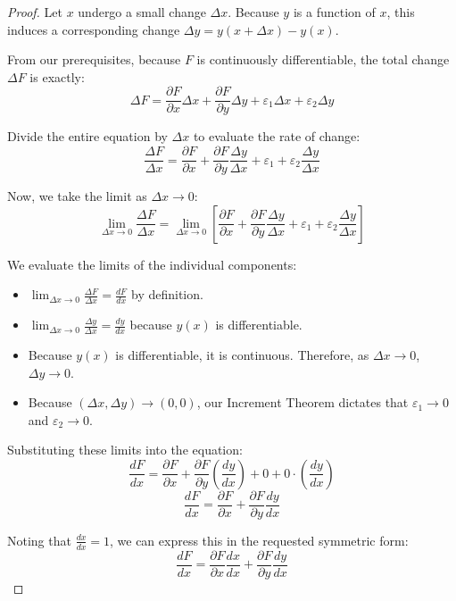 \documentclass{essay}
\begin{document}
\begin{proof}
  Let \(x\) undergo a small change \(\Delta x\). Because \(y\) is a function of \(x\), this induces a corresponding change \(\Delta y = y(x+\Delta x) - y(x)\).

  From our prerequisites, because \(F\) is continuously differentiable, the total change \(\Delta F\) is exactly:
  \[ \Delta F = \frac{\partial F}{\partial x}\Delta x + \frac{\partial F}{\partial y}\Delta y + \varepsilon_{1} \Delta x + \varepsilon_{2} \Delta y \]

  Divide the entire equation by \(\Delta x\) to evaluate the rate of change:
  \[ \frac{\Delta F}{\Delta x} = \frac{\partial F}{\partial x} + \frac{\partial F}{\partial y}\frac{\Delta y}{\Delta x} + \varepsilon_{1} + \varepsilon_{2} \frac{\Delta y}{\Delta x} \]

  Now, we take the limit as \(\Delta x \to 0\):
  \[ \lim_{\Delta x \to 0} \frac{\Delta F}{\Delta x} = \lim_{\Delta x \to 0} \left[ \frac{\partial F}{\partial x} + \frac{\partial F}{\partial y}\frac{\Delta y}{\Delta x} + \varepsilon_{1} + \varepsilon_{2} \frac{\Delta y}{\Delta x} \right] \]

  We evaluate the limits of the individual components:
  \begin{itemize}
    \item \(\lim_{\Delta x \to 0} \frac{\Delta F}{\Delta x} = \frac{dF}{dx}\) by definition.
    \item \(\lim_{\Delta x \to 0} \frac{\Delta y}{\Delta x} = \frac{dy}{dx}\) because \(y(x)\) is differentiable.
    \item Because \(y(x)\) is differentiable, it is continuous. Therefore, as \(\Delta x \to 0\), \(\Delta y \to 0\).
    \item Because \((\Delta x, \Delta y) \to (0,0)\), our Increment Theorem dictates that \(\varepsilon_{1} \to 0\) and \(\varepsilon_{2} \to 0\).
  \end{itemize}

  Substituting these limits into the equation:
  \[ \frac{dF}{dx} = \frac{\partial F}{\partial x} + \frac{\partial F}{\partial y}\left(\frac{dy}{dx}\right) + 0 + 0 \cdot \left(\frac{dy}{dx}\right) \]
  \[ \frac{dF}{dx} = \frac{\partial F}{\partial x} + \frac{\partial F}{\partial y}\frac{dy}{dx} \]

  Noting that \(\frac{dx}{dx} = 1\), we can express this in the requested symmetric form:
  \[ \frac{dF}{dx} = \frac{\partial F}{\partial x}\frac{dx}{dx} + \frac{\partial F}{\partial y}\frac{dy}{dx} \]
\end{proof}
\end{document}

